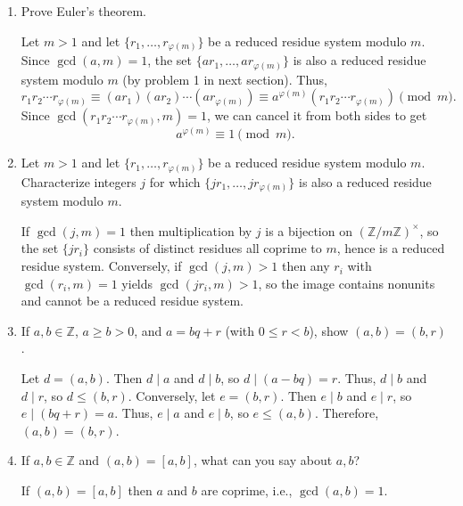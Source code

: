 \documentclass[11pt]{article}
\begin{document}
\newpage





\begin{enumerate}
  \item Prove Euler's theorem.
  \begin{subprove}
    Let $m>1$ and let $\{r_1,\dots,r_{\varphi(m)}\}$ be a reduced residue system modulo $m$. Since $\gcd(a,m)=1$, the set $\{ar_1,\dots,ar_{\varphi(m)}\}$ is also a reduced residue system modulo $m$ (by problem 1 in next section). Thus,
    \[
      r_1 r_2 \cdots r_{\varphi(m)} \equiv (ar_1)(ar_2) \cdots (ar_{\varphi(m)}) \equiv a^{\varphi(m)}(r_1 r_2 \cdots r_{\varphi(m)}) \pmod m.
    \]
    Since $\gcd(r_1 r_2 \cdots r_{\varphi(m)}, m) = 1$, we can cancel it from both sides to get
    \[
      a^{\varphi(m)} \equiv 1 \pmod m.
    \]
  \end{subprove}

  \item Let $m>1$ and let $\{r_1,\dots,r_{\varphi(m)}\}$ be a reduced residue 
  system modulo $m$. Characterize integers $j$ for which 
  $\{jr_1,\dots,jr_{\varphi(m)}\}$ is also a reduced residue system modulo $m$.
  \begin{subprove}
    If $\gcd(j,m)=1$ then multiplication by $j$ is a bijection on $(\mathbb Z/m\mathbb Z)^\times$, so the set $\{jr_i\}$ consists of distinct residues all coprime to $m$, hence is a reduced residue system. Conversely, if $\gcd(j,m)>1$ then any $r_i$ with $\gcd(r_i,m)=1$ yields $\gcd(jr_i,m)>1$, so the image contains nonunits and cannot be a reduced residue system.
  \end{subprove}





  \item If $a,b\in\mathbb Z$, $a\ge b>0$, and $a=bq+r$ (with $0\le r<b$), show $(a,b)=(b,r)$.
  \begin{subprove}
    Let $d=(a,b)$. Then $d\mid a$ and $d\mid b$, so $d\mid(a-bq)=r$. Thus, $d\mid b$ and $d\mid r$, so $d\le(b,r)$. Conversely, let $e=(b,r)$. Then $e\mid b$ and $e\mid r$, so $e\mid(bq+r)=a$. Thus, $e\mid a$ and $e\mid b$, so $e\le(a,b)$. Therefore, $(a,b)=(b,r)$.
  \end{subprove}

  \item If $a,b\in\mathbb Z$ and $(a,b)=[a,b]$, what can you say about $a,b$?
  \begin{subprove}
    If $(a,b)=[a,b]$ then $a$ and $b$ are coprime, i.e., $\gcd(a,b)=1$.
  \end{subprove}


\end{enumerate}
\end{document}
